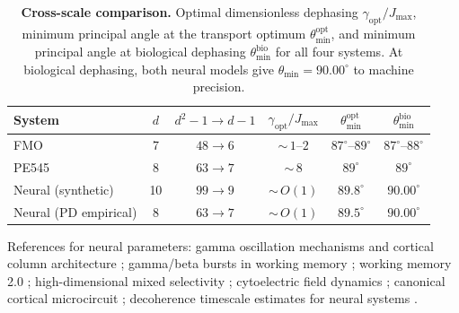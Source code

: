\documentclass[12pt,a4paper]{article}
\theoremstyle{definition}
\theoremstyle{remark}
\begin{document}
\begin{table}[H]
\centering
\caption{\textbf{Cross-scale comparison.} Optimal dimensionless dephasing $\gamma_{\mathrm{opt}}/J_{\max}$, minimum principal angle at the transport optimum $\theta_{\min}^{\mathrm{opt}}$, and minimum principal angle at biological dephasing $\theta_{\min}^{\mathrm{bio}}$ for all four systems. At biological dephasing, both neural models give $\theta_{\min} = 90.00^\circ$ to machine precision.}
\label{tab:neural-comparison}
\smallskip
\begin{tabular}{lccccc}
\hline
System & $d$ & $d^2{-}1 \to d{-}1$ & $\gamma_{\mathrm{opt}}/J_{\max}$ & $\theta_{\min}^{\mathrm{opt}}$ & $\theta_{\min}^{\mathrm{bio}}$ \\
\hline
FMO           &  7 & $48 \to 6$  & ${\sim}\,1$--$2$    & $87^\circ$--$89^\circ$ & $87^\circ$--$88^\circ$ \\
PE545         &  8 & $63 \to 7$  & ${\sim}\,8$         & $89^\circ$             & $89^\circ$ \\
Neural (synthetic)  & 10 & $99 \to 9$  & ${\sim}\,O(1)$      & $89.8^\circ$           & $90.00^\circ$ \\
Neural (PD empirical)   &  8 & $63 \to 7$  & ${\sim}\,O(1)$      & $89.5^\circ$           & $90.00^\circ$ \\
\hline
\end{tabular}
\end{table}

References for neural parameters: gamma oscillation mechanisms and cortical column architecture \cite{buzsaki2012mechanisms}; gamma/beta bursts in working memory \cite{lundqvist2016gamma}; working memory 2.0 \cite{miller2018working}; high-dimensional mixed selectivity \cite{fusi2016neurons,rigotti2013importance}; cytoelectric field dynamics \cite{pinotsis2023cytoelectric}; canonical cortical microcircuit \cite{potjans2014cell}; decoherence timescale estimates for neural systems \cite{tegmark2000importance}.
\end{document}
